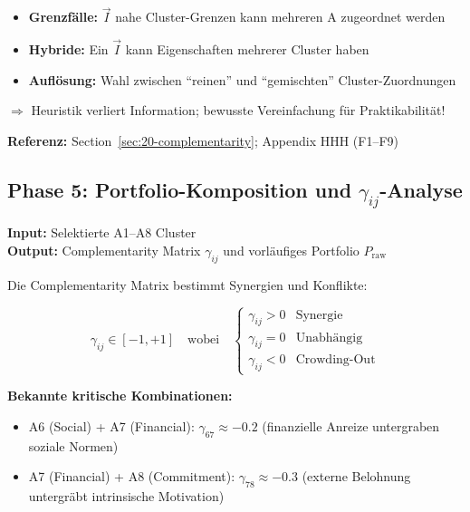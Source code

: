 \begin{tcolorbox}[colback=orange!5!white, colframe=orange!75!black,
    title=\textbf{Variabilität in Phase 4}]
\begin{itemize}[nosep]
\item \textbf{Grenzfälle:} $\vec{I}$ nahe Cluster-Grenzen kann mehreren A zugeordnet werden
\item \textbf{Hybride:} Ein $\vec{I}$ kann Eigenschaften mehrerer Cluster haben
\item \textbf{Auflösung:} Wahl zwischen ``reinen'' und ``gemischten'' Cluster-Zuordnungen
\end{itemize}
$\Rightarrow$ Heuristik verliert Information; bewusste Vereinfachung für Praktikabilität!
\end{tcolorbox}

\textbf{Referenz:} Section~\ref{sec:20-complementarity}; Appendix HHH (F1--F9)

\subsection{Phase 5: Portfolio-Komposition und $\gamma_{ij}$-Analyse}
\label{sec:20-phase5}

\textbf{Input:} Selektierte A1--A8 Cluster\\
\textbf{Output:} Complementarity Matrix $\gamma_{ij}$ und vorläufiges Portfolio $P_{\text{raw}}$

Die Complementarity Matrix bestimmt Synergien und Konflikte:

\begin{equation}
\gamma_{ij} \in [-1, +1] \quad \text{wobei} \quad
\begin{cases}
\gamma_{ij} > 0 & \text{Synergie} \\
\gamma_{ij} = 0 & \text{Unabhängig} \\
\gamma_{ij} < 0 & \text{Crowding-Out}
\end{cases}
\end{equation}

\textbf{Bekannte kritische Kombinationen:}
\begin{itemize}[nosep]
\item A6 (Social) + A7 (Financial): $\gamma_{67} \approx -0.2$ (finanzielle Anreize untergraben soziale Normen)
\item A7 (Financial) + A8 (Commitment): $\gamma_{78} \approx -0.3$ (externe Belohnung untergräbt intrinsische Motivation)
\end{itemize}

